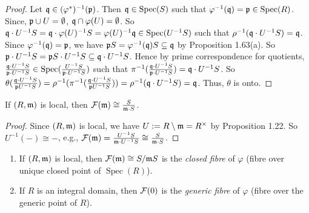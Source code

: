 \begin{proof}
    Let $\mathfrak{q} \in (\varphi^*)^{-1}(\mathfrak{p})$. Then $\mathfrak{q} \in \operatorname{Spec}(S)$ such that $\varphi^{-1}(\mathfrak{q}) = \mathfrak{p} \in \operatorname{Spec}(R)$. Since, $\mathfrak{p} \cup U = \emptyset$, $\mathfrak{q} \cap \varphi(U) = \emptyset$. So $\mathfrak{q} \cdot U^{-1}S = \mathfrak{q} \cdot \varphi(U)^{-1}S = \varphi(U)^{-1} \mathfrak{q} \in \operatorname{Spec}(U^{-1}S)$ such that $\rho^{-1}(\mathfrak{q} \cdot U^{-1}S) = \mathfrak{q}$. Since $\varphi^{-1}(\mathfrak{q}) = \mathfrak{p}$, we have $\mathfrak{p} S = \varphi^{-1}(\mathfrak{q})S \subseteq \mathfrak{q}$ by Proposition 1.63(a). So $\mathfrak{p} \cdot U^{-1}S = \mathfrak{p} S \cdot U^{-1}S \subseteq \mathfrak{q} \cdot U^{-1}S$. Hence by prime correspondence for quotients, $\frac{\mathfrak{q} \cdot U^{-1}S}{\mathfrak{p} \cdot U^{-1}S} \in \operatorname{Spec}(\frac{U^{-1}S}{\mathfrak{p} \cdot U^{-1}S})$ such that $\pi^{-1}(\frac{\mathfrak{q} \cdot U^{-1}S}{\mathfrak{p} \cdot U^{-1}S}) = \mathfrak{q} \cdot U^{-1}S$. So $\theta(\frac{\mathfrak{q} \cdot U^{-1}S}{\mathfrak{p} U^{-1}S}) = \rho^{-1}(\pi^{-1}(\frac{\mathfrak{q} \cdot U^{-1}S}{\mathfrak{p} U^{-1}S})) = \rho^{-1}(\mathfrak{q} \cdot U^{-1}S) = \mathfrak{q}$. Thus, $\theta$ is onto. \qedhere
\end{proof}

\begin{proposition}
    If $(R,\mathfrak{m})$ is local, then $\mathcal{F}(\mathfrak{m}) \cong \frac{S}{\mathfrak{m} \cdot S}$.
\end{proposition}

\begin{proof}
    Since $(R,\mathfrak{m})$ is local, we have $U := R \setminus \mathfrak{m} = R^\times$ by Proposition 1.22. So $U^{-1}(-) \cong -$, e.g., $\mathcal{F}(\mathfrak{m}) = \frac{U^{-1}S}{\mathfrak{m} \cdot U^{-1}S} \cong \frac{S}{\mathfrak{m} \cdot S}$.
\end{proof}

\begin{definition}
    \begin{enumerate}
        \item 
            If $(R,\mathfrak{m})$ is local, then $\mathcal{F}(\mathfrak{m}) \cong S/\mathfrak{m} S$ is the \emph{closed fibre} of $\varphi$ (fibre over unique closed point of $\operatorname{Spec}(R)$).
        \item 
            If $R$ is an integral domain, then $\mathcal{F}(0)$ is the \emph{generic fibre} of $\varphi$ (fibre over the generic point of $R$).
    \end{enumerate}
\end{definition}

